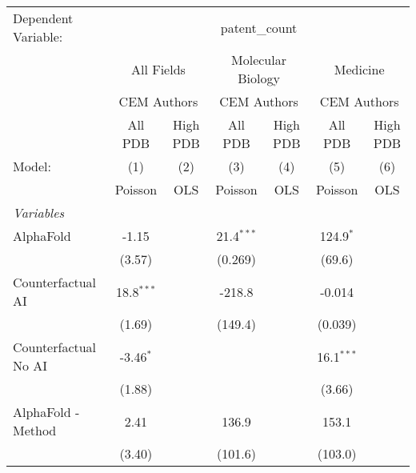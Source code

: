 \begingroup
\centering
\begin{tabular}{lcccccc}
   \tabularnewline \midrule \midrule
   Dependent Variable: & \multicolumn{6}{c}{patent\_count}\\
 & \multicolumn{2}{c}{All Fields} & \multicolumn{2}{c}{Molecular Biology} & \multicolumn{2}{c}{Medicine} \\
\cmidrule(lr){2-3} \cmidrule(lr){4-5} \cmidrule(lr){6-7}
 & \multicolumn{2}{c}{CEM Authors} & \multicolumn{2}{c}{CEM Authors} & \multicolumn{2}{c}{CEM Authors} \\
\cmidrule(lr){2-3} \cmidrule(lr){4-5} \cmidrule(lr){6-7}
 & \multicolumn{1}{c}{All PDB} & \multicolumn{1}{c}{High PDB} & \multicolumn{1}{c}{All PDB} & \multicolumn{1}{c}{High PDB} & \multicolumn{1}{c}{All PDB} & \multicolumn{1}{c}{High PDB} \\
\cmidrule(lr){2-2} \cmidrule(lr){3-3} \cmidrule(lr){4-4} \cmidrule(lr){5-5} \cmidrule(lr){6-6} \cmidrule(lr){7-7}
   Model:                                                     & (1)           & (2)  & (3)          & (4)  & (5)          & (6)\\  
                                                              &  Poisson      & OLS  & Poisson      & OLS  & Poisson      & OLS\\  
   \midrule
   \emph{Variables}\\
   AlphaFold                                                  & -1.15         &      & 21.4$^{***}$ &      & 124.9$^{*}$  &   \\   
                                                              & (3.57)        &      & (0.269)      &      & (69.6)       &   \\   
   Counterfactual AI                                          & 18.8$^{***}$  &      & -218.8       &      & -0.014       &   \\   
                                                              & (1.69)        &      & (149.4)      &      & (0.039)      &   \\   
   Counterfactual No AI                                       & -3.46$^{*}$   &      &              &      & 16.1$^{***}$ &   \\   
                                                              & (1.88)        &      &              &      & (3.66)       &   \\   
   AlphaFold - Method                                         & 2.41          &      & 136.9        &      & 153.1        &   \\   
                                                              & (3.40)        &      & (101.6)      &      & (103.0)      &   \\   

\end{tabular}
